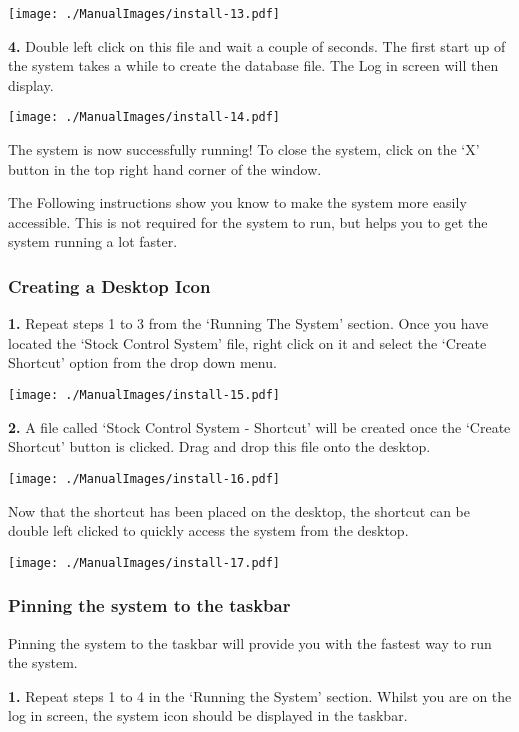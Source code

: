 \texttt{[image: ./ManualImages/install-13.pdf]}

\textbf{4.} Double left click on this file and wait a couple of seconds. The first start up of the system takes a while to create the database file. The Log in screen will then display.

\texttt{[image: ./ManualImages/install-14.pdf]}

The system is now successfully running! To close the system, click on the `X' button in the top right hand corner of the window.

\pagebreak

The Following instructions show you know to make the system more easily accessible. This is not required for the system to run, but helps you to get the system running a lot faster.

\subsubsection{Creating a Desktop Icon}

\textbf{1.} Repeat steps 1 to 3 from the `Running The System' section. Once you have located the `Stock Control System' file, right click on it and select the `Create Shortcut' option from the drop down menu.

\texttt{[image: ./ManualImages/install-15.pdf]}

\textbf{2.} A file called `Stock Control System - Shortcut' will be created once the `Create Shortcut' button is clicked. Drag and drop this file onto the desktop.

\texttt{[image: ./ManualImages/install-16.pdf]}

Now that the shortcut has been placed on the desktop, the shortcut can be double left clicked to quickly access the system from the desktop.

\texttt{[image: ./ManualImages/install-17.pdf]}

\subsubsection{Pinning the system to the taskbar}

Pinning the system to the taskbar will provide you with the fastest way to run the system.

\textbf{1.} Repeat steps 1 to 4 in the `Running the System' section. Whilst you are on the log in screen, the system icon should be displayed in the taskbar.

